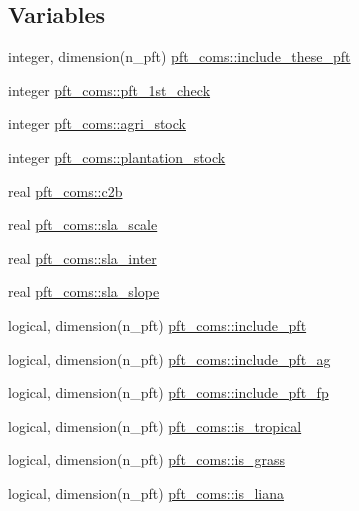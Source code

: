 \subsection*{Variables}
\begin{DoxyCompactItemize}
\item 
integer, dimension(n\+\_\+pft) \hyperlink{namespacepft__coms_a7ab2f215846d8f15e70deeb77fa8802e}{pft\+\_\+coms\+::include\+\_\+these\+\_\+pft}
\item 
integer \hyperlink{namespacepft__coms_a46f15da0b9bf81a4f8bdba850efff1c8}{pft\+\_\+coms\+::pft\+\_\+1st\+\_\+check}
\item 
integer \hyperlink{namespacepft__coms_afa924efff5f6897a77ef72109bfb8811}{pft\+\_\+coms\+::agri\+\_\+stock}
\item 
integer \hyperlink{namespacepft__coms_abade08057c8846615ec5ff4ff9d3ffa2}{pft\+\_\+coms\+::plantation\+\_\+stock}
\item 
real \hyperlink{namespacepft__coms_a2613e7dd1fa05af83d058d81f92946ec}{pft\+\_\+coms\+::c2b}
\item 
real \hyperlink{namespacepft__coms_a1ba9e47e49347dca3d82a5d2a694136d}{pft\+\_\+coms\+::sla\+\_\+scale}
\item 
real \hyperlink{namespacepft__coms_a7f2175fb500b1a4a0558108744ef6da8}{pft\+\_\+coms\+::sla\+\_\+inter}
\item 
real \hyperlink{namespacepft__coms_abac97f719f7239eac0e2ad92dc9a8bef}{pft\+\_\+coms\+::sla\+\_\+slope}
\item 
logical, dimension(n\+\_\+pft) \hyperlink{namespacepft__coms_a01416a40237dfc9b75e2205ff91ef2be}{pft\+\_\+coms\+::include\+\_\+pft}
\item 
logical, dimension(n\+\_\+pft) \hyperlink{namespacepft__coms_a39d76f589c044b393db74ff7392193c7}{pft\+\_\+coms\+::include\+\_\+pft\+\_\+ag}
\item 
logical, dimension(n\+\_\+pft) \hyperlink{namespacepft__coms_adc76e53cf81aef56357b589214fd3700}{pft\+\_\+coms\+::include\+\_\+pft\+\_\+fp}
\item 
logical, dimension(n\+\_\+pft) \hyperlink{namespacepft__coms_ae26d357a418f5441d136c81e335cd633}{pft\+\_\+coms\+::is\+\_\+tropical}
\item 
logical, dimension(n\+\_\+pft) \hyperlink{namespacepft__coms_a74313e4ba2eb3134ae662a573ee862e4}{pft\+\_\+coms\+::is\+\_\+grass}
\item 
logical, dimension(n\+\_\+pft) \hyperlink{namespacepft__coms_a72d72373c3e4e66defb4dc9923258e42}{pft\+\_\+coms\+::is\+\_\+liana}
\item 

\end{DoxyCompactItemize}
